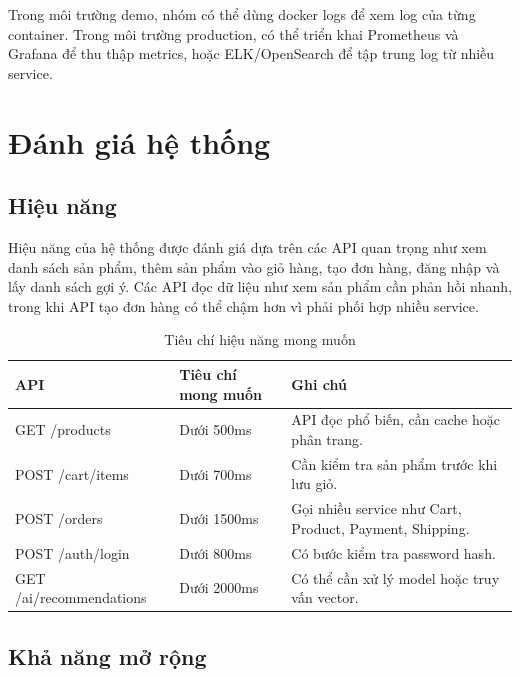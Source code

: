 \documentclass[../main.tex]{subfiles}
\begin{document}
Trong môi trường demo, nhóm có thể dùng docker logs để xem log của từng container. Trong môi trường production, có thể triển khai Prometheus và Grafana để thu thập metrics, hoặc ELK/OpenSearch để tập trung log từ nhiều service.

\section{Đánh giá hệ thống}
\label{section:4.10}

\subsection{Hiệu năng}
\label{subsection:4.10.1}

Hiệu năng của hệ thống được đánh giá dựa trên các API quan trọng như xem danh sách sản phẩm, thêm sản phẩm vào giỏ hàng, tạo đơn hàng, đăng nhập và lấy danh sách gợi ý. Các API đọc dữ liệu như xem sản phẩm cần phản hồi nhanh, trong khi API tạo đơn hàng có thể chậm hơn vì phải phối hợp nhiều service.

\begin{table}[H]
    \centering
    \caption{Tiêu chí hiệu năng mong muốn}
    \label{tab:chapter4-performance-targets}
    \begin{tabular}{|p{}|p{}|p{}|}
        \hline
        \rowcolor{primary!35}
        \textbf{API} & \textbf{Tiêu chí mong muốn} & \textbf{Ghi chú} \\
        \hline
        GET /products & Dưới 500ms & API đọc phổ biến, cần cache hoặc phân trang. \\
        \hline
        POST /cart/items & Dưới 700ms & Cần kiểm tra sản phẩm trước khi lưu giỏ. \\
        \hline
        POST /orders & Dưới 1500ms & Gọi nhiều service như Cart, Product, Payment, Shipping. \\
        \hline
        POST /auth/login & Dưới 800ms & Có bước kiểm tra password hash. \\
        \hline
        GET /ai/recommendations & Dưới 2000ms & Có thể cần xử lý model hoặc truy vấn vector. \\
        \hline
    \end{tabular}
\end{table}

\subsection{Khả năng mở rộng}
\label{subsection:4.10.2}
\end{document}
